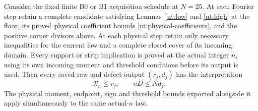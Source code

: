 \begin{proposition}\label{ut:transfer}
Consider the fixed finite B0 or B1 acquisition schedule at $N=25$.
At each Fourier step retain a complete candidate satisfying
Lemmas~\ref{ut:low} and \ref{ut:high} at the floor, its proved
physical coefficient bounds \eqref{ut:physical-coefficients}, and
the positive corner divisors above. At each physical step retain only
necessary inequalities for the current law and a complete closed
cover of its incoming domain. Every support or strip implication is
proved at the actual integer $n$, using its own incoming moment and
threshold conditions before its output is used.
Then every saved raw and defect output $(r_j,d_j)$ has the interpretation
\begin{equation}\label{ut:induction-invariant}
 \mathcal R_n\le r_j,\qquad nD\le Nd_j.
\end{equation}
The physical moment, endpoint, sign and threshold bounds exported
alongside it apply simultaneously to the same actual-$n$ law.
\end{proposition}
